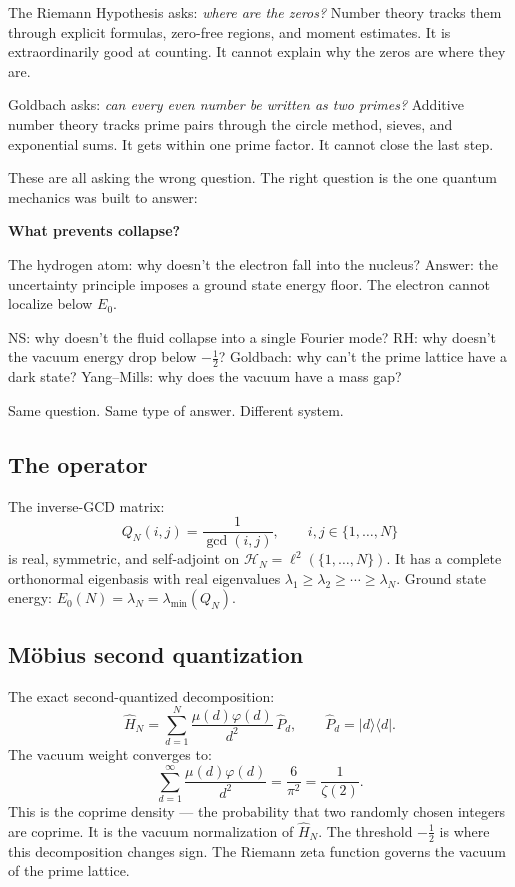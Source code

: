 \documentclass[12pt]{article}
\newcommand{\ket}[1]{|{#1}\rangle}
\newcommand{\bra}[1]{\langle{#1}|}
\newcommand{\Hil}{\mathcal{H}}
\newcommand{\half}{\tfrac{1}{2}}
\begin{document}
The Riemann Hypothesis asks: \emph{where are the zeros?}
Number theory tracks them through explicit formulas, zero-free regions,
and moment estimates.
It is extraordinarily good at counting.
It cannot explain why the zeros are where they are.

Goldbach asks: \emph{can every even number be written as two primes?}
Additive number theory tracks prime pairs through the circle method,
sieves, and exponential sums.
It gets within one prime factor.
It cannot close the last step.

These are all asking the wrong question.
The right question is the one quantum mechanics was built to answer:

\begin{center}
\textbf{\large What prevents collapse?}
\end{center}

The hydrogen atom: why doesn't the electron fall into the nucleus?
Answer: the uncertainty principle imposes a ground state energy floor.
The electron cannot localize below $E_0$.

NS: why doesn't the fluid collapse into a single Fourier mode?
RH: why doesn't the vacuum energy drop below $-\half$?
Goldbach: why can't the prime lattice have a dark state?
Yang--Mills: why does the vacuum have a mass gap?

Same question. Same type of answer. Different system.

\subsection{The operator}

The inverse-GCD matrix:
\[
  Q_N(i,j) = \frac{1}{\gcd(i,j)}, \qquad i,j \in \{1,\ldots,N\}
\]
is real, symmetric, and self-adjoint on $\Hil_N = \ell^2(\{1,\ldots,N\})$.
It has a complete orthonormal eigenbasis with real eigenvalues
$\lambda_1 \ge \lambda_2 \ge \cdots \ge \lambda_N$.
Ground state energy: $E_0(N) = \lambda_N = \lambda_{\min}(Q_N)$.

\subsection{M\"{o}bius second quantization}

\begin{tcolorbox}[qbox]
The exact second-quantized decomposition:
\[
  \hat{H}_N = \sum_{d=1}^{N} \frac{\mu(d)\varphi(d)}{d^2}\,\hat{P}_d,
  \qquad \hat{P}_d = \ket{d}\bra{d}.
\]
The vacuum weight converges to:
\[
  \sum_{d=1}^\infty \frac{\mu(d)\varphi(d)}{d^2}
  = \frac{6}{\pi^2} = \frac{1}{\zeta(2)}.
\]
This is the coprime density --- the probability that two randomly chosen
integers are coprime.
It is the vacuum normalization of $\hat{H}_N$.
The threshold $-\half$ is where this decomposition changes sign.
The Riemann zeta function governs the vacuum of the prime lattice.
\end{tcolorbox}
\end{document}
